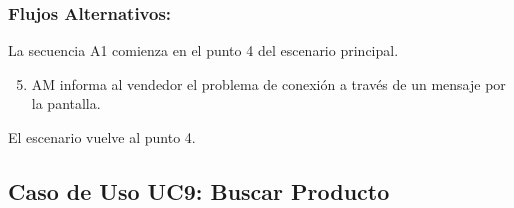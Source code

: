 \begin{framed}
\subsubsection{Flujos Alternativos: }

La secuencia A1 comienza en el punto 4 del escenario principal.
\begin{enumerate}
    \setcounter{enumi}{4}
    \item AM informa al vendedor el problema de conexión a través de un mensaje por la pantalla.
\end{enumerate}
El escenario vuelve al punto 4.

\end{framed}


\subsection{Caso de Uso UC9: Buscar Producto}

